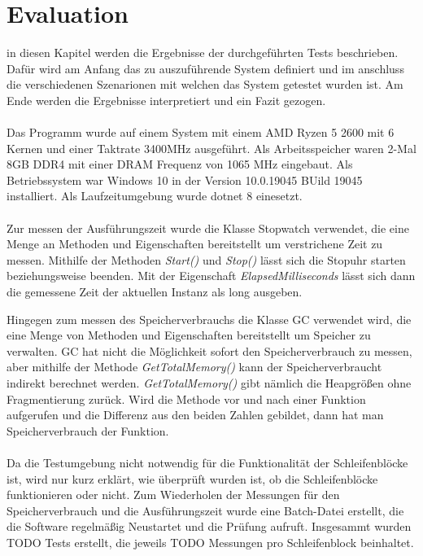 \documentclass{article}
\begin{document}
    \section{Evaluation}
    \label{Evaluation}
    in diesen Kapitel werden die Ergebnisse der durchgeführten Tests beschrieben.
    Dafür wird am Anfang das zu auszuführende System definiert und im anschluss die verschiedenen Szenarionen mit welchen das System getestet wurden ist.
    Am Ende werden die Ergebnisse interpretiert und ein Fazit gezogen.\\
    \\
    Das Programm wurde auf einem System mit einem AMD Ryzen 5 2600 mit 6 Kernen und einer Taktrate 3400MHz ausgeführt. Als Arbeitsspeicher waren 2-Mal 8GB DDR4 mit einer DRAM Frequenz von 1065 MHz eingebaut. 
    Als Betriebssystem war Windows 10 in der Version 10.0.19045 BUild 19045 installiert. Als Laufzeitumgebung wurde dotnet 8 einesetzt.\\
    \\
    Zur messen der Ausführungszeit wurde die Klasse Stopwatch verwendet, die eine Menge an Methoden und Eigenschaften bereitstellt um verstrichene Zeit zu messen.
    Mithilfe der Methoden \textit{Start()} und \textit{Stop()} lässt sich die Stopuhr starten beziehungsweise beenden. Mit der Eigenschaft \textit{ElapsedMilliseconds} lässt sich dann die gemessene Zeit der aktuellen Instanz als long ausgeben.\par
    Hingegen zum messen des Speicherverbrauchs die Klasse GC verwendet wird, die eine Menge von Methoden und Eigenschaften bereitstellt um Speicher zu verwalten.
    GC hat nicht die Möglichkeit sofort den Speicherverbrauch zu messen, aber mithilfe der Methode \textit{GetTotalMemory()} kann der Speicherverbraucht indirekt berechnet werden.
    \textit{GetTotalMemory()} gibt nämlich die Heapgrößen ohne Fragmentierung zurück. 
    Wird die Methode vor und nach einer Funktion aufgerufen und die Differenz aus den beiden Zahlen gebildet, dann hat man Speicherverbrauch der Funktion.\\
    \\
    Da die Testumgebung nicht notwendig für die Funktionalität der Schleifenblöcke ist, wird nur kurz erklärt, wie überprüft wurden ist, ob die Schleifenblöcke funktionieren oder nicht.
    Zum Wiederholen der Messungen für den Speicherverbrauch und die Ausführungszeit wurde eine Batch-Datei erstellt, die die Software regelmäßig Neustartet und die Prüfung aufruft.
    Insgesammt wurden TODO Tests erstellt, die jeweils TODO Messungen pro Schleifenblock beinhaltet.
\end{document}

